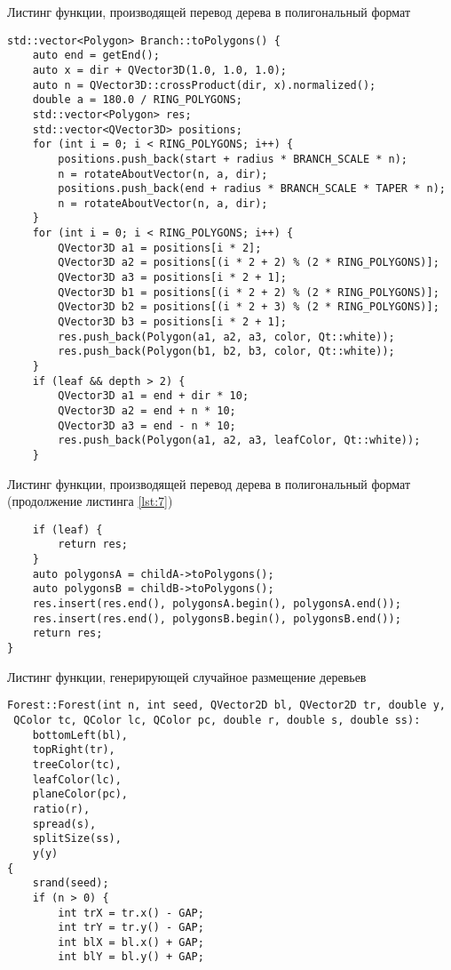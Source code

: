 \newpage
\begin{code}
\caption{Листинг функции, производящей перевод дерева в полигональный формат}
\label{lst:7}
\begin{verbatim}
std::vector<Polygon> Branch::toPolygons() {
    auto end = getEnd();
    auto x = dir + QVector3D(1.0, 1.0, 1.0);
    auto n = QVector3D::crossProduct(dir, x).normalized();
    double a = 180.0 / RING_POLYGONS;
    std::vector<Polygon> res;
    std::vector<QVector3D> positions;
    for (int i = 0; i < RING_POLYGONS; i++) {
        positions.push_back(start + radius * BRANCH_SCALE * n);
        n = rotateAboutVector(n, a, dir);
        positions.push_back(end + radius * BRANCH_SCALE * TAPER * n);
        n = rotateAboutVector(n, a, dir);
    }
    for (int i = 0; i < RING_POLYGONS; i++) {
        QVector3D a1 = positions[i * 2];
        QVector3D a2 = positions[(i * 2 + 2) % (2 * RING_POLYGONS)];
        QVector3D a3 = positions[i * 2 + 1];
        QVector3D b1 = positions[(i * 2 + 2) % (2 * RING_POLYGONS)];
        QVector3D b2 = positions[(i * 2 + 3) % (2 * RING_POLYGONS)];
        QVector3D b3 = positions[i * 2 + 1];
        res.push_back(Polygon(a1, a2, a3, color, Qt::white));
        res.push_back(Polygon(b1, b2, b3, color, Qt::white));
    }
    if (leaf && depth > 2) {
        QVector3D a1 = end + dir * 10;
        QVector3D a2 = end + n * 10;
        QVector3D a3 = end - n * 10;
        res.push_back(Polygon(a1, a2, a3, leafColor, Qt::white));
    }
\end{verbatim}
\end{code}

\newpage
\begin{code}
\caption{Листинг функции, производящей перевод дерева в полигональный формат (продолжение листинга \ref{lst:7})}
\label{lst:8}
\begin{verbatim}
    if (leaf) {
        return res;
    }
    auto polygonsA = childA->toPolygons();
    auto polygonsB = childB->toPolygons();
    res.insert(res.end(), polygonsA.begin(), polygonsA.end());
    res.insert(res.end(), polygonsB.begin(), polygonsB.end());
    return res;
}
\end{verbatim}
\end{code}

\begin{code}
\caption{Листинг функции, генерирующей случайное размещение деревьев}
\label{lst:9}
\begin{verbatim}
Forest::Forest(int n, int seed, QVector2D bl, QVector2D tr, double y,
 QColor tc, QColor lc, QColor pc, double r, double s, double ss):
    bottomLeft(bl),
    topRight(tr),
    treeColor(tc),
    leafColor(lc),
    planeColor(pc),
    ratio(r),
    spread(s),
    splitSize(ss),
    y(y)
{
    srand(seed);
    if (n > 0) {
        int trX = tr.x() - GAP;
        int trY = tr.y() - GAP;
        int blX = bl.x() + GAP;
        int blY = bl.y() + GAP;
\end{verbatim}
\end{code}

